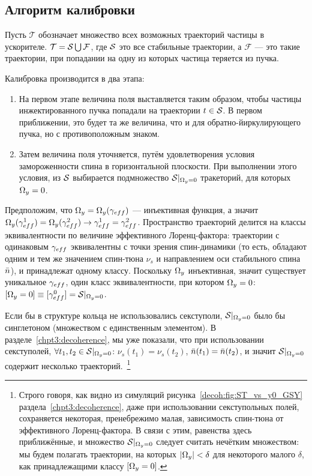
\newcommand{\Traj}{\mathcal T}
\newcommand{\Fail}{\mathcal F}
\newcommand{\CO}{\mathrm{CO}}


\subsection{Алгоритм калибровки}
Пусть $\Traj$ обозначает множество всех возможных траекторий частицы в ускорителе. $\Traj = \Stab \bigcup \Fail$,
где $\Stab$ это все стабильные траектории, а $\Fail$ --- это такие траектории,
при попадании на одну из которых частица теряется из пучка.

Калибровка производится в два этапа:
\begin{enumerate}
\item На первом этапе величина поля выставляется таким образом, чтобы частицы инжектированного пучка
попадали на траектории $t\in \Stab$. В первом приближении, это будет та же величина,
что и для обратно-йиркулирующего пучка, но с противоположным знаком.
\item Затем величина поля уточняется, путём удовлетворения условия замороженности спина в горизонтальной
плоскости. При выполнении этого условия, из $\Stab$ выбирается подмножество $\Stab*$ тракеторий, для которых
$\Omega_y = 0$.
\end{enumerate}

Предположим, что $\W_y = \W_y(\g*)$ --- инъективная функция, а значит
$\W_y(\g*^1) = \W_y(\g*^2) \rightarrow \g*^1 = \g*^2$. Пространство траекторий делится на
классы эквивалентности по величине эффективного Лоренц-фактора: траектории с одинаковым $\g*$ эквивалентны
с точки зрения спин-динамики (то есть, обладают одним и тем же значением спин-тюна $\nu_s$ и направлением
оси стабильного спина $\bar n$), и принадлежат одному классу. Поскольку $\Omega_y$ инъективная, значит существует
уникальное $\g*$, один класс эквивалентности, при котором $\Omega_y=0$: $[\W_y=0]\equiv [\g*^0] = \Stab*$.

Если бы в структуре кольца не использовались секступоли, $\Stab*$ было бы синглетоном (множеством с
единственным элементом). В разделе~\ref{chpt3:decoherence}, мы уже показали, что
при использовании секступолей, $\forall t_1,t_2\in\Stab*$:
$\nu_s(t_1) = \nu_s(t_2)$, $\bar n(t_1) = \bar n(t_2)$, и значит $\Stab*$ содержит
несколько траекторий.~\footnote{Строго говоря, как видно из симуляций рисунка~\ref{decoh:fig:ST_vs_y0_GSY}
раздела~\ref{chpt3:decoherence}, даже при использовании секступольных полей, сохраняется некоторая,
пренебрежимо малая, зависимость спин-тюна от эффективного Лоренц-фактора. В связи с этим, равенства
здесь приближённые, и множество $\Stab*$ следует считать нечётким множеством: мы будем полагать траектории,
на которых $|\Omega_y| < \delta$ для некоторого малого $\delta$, как принадлежащими классу $[\Omega_y=0]$.}



